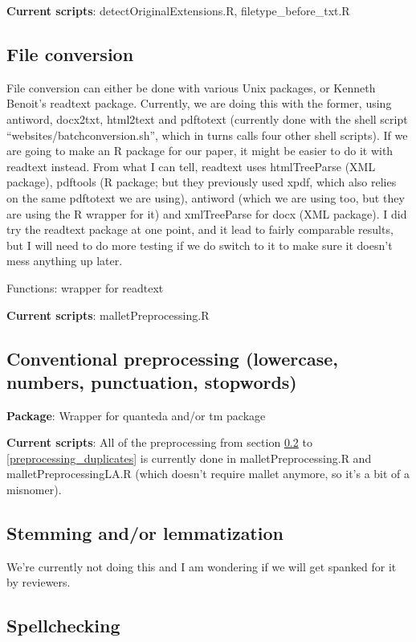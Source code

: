 \documentclass[11pt]{article}
\begin{document}
\textbf{Current scripts}: detectOriginalExtensions.R, filetype\_before\_txt.R

\subsection{File conversion}
File conversion can either be done with various Unix packages, or Kenneth Benoit's readtext package. Currently, we are doing this with the former, using antiword, docx2txt, html2text and pdftotext (currently done with the shell script ``websites/batchconversion.sh'', which in turns calls four other shell scripts). If we are going to make an R package for our paper, it might be easier to do it with readtext instead. From what I can tell, readtext uses htmlTreeParse (XML package), pdftools (R package; but they previously used xpdf, which also relies on the same pdftotext we are using), antiword (which we are using too, but they are using the R wrapper for it) and xmlTreeParse for docx (XML package). I did try the readtext package at one point, and it lead to fairly comparable results, but I will need to do more testing if we do switch to it to make sure it doesn't mess anything up later.

Functions: wrapper for readtext

\textbf{Current scripts}: malletPreprocessing.R

\subsection{Conventional preprocessing (lowercase, numbers, punctuation, stopwords)} \label{preprocessing_conventional}

\textbf{Package}: Wrapper for quanteda and/or tm package

\textbf{Current scripts}: All of the preprocessing from section \ref{preprocessing_conventional} to \ref{preprocessing_duplicates} is currently done in malletPreprocessing.R and malletPreprocessingLA.R (which doesn't require mallet anymore, so it's a bit of a misnomer).

\subsection{Stemming and/or lemmatization}
We're currently not doing this and I am wondering if we will get spanked for it by reviewers.

\subsection{Spellchecking}
\end{document}
